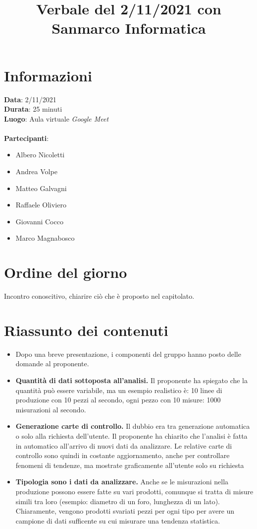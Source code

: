 \documentclass[a4paper,12pt]{article}
\author{}
\date{}
\begin{document}
\title{Verbale del 2/11/2021 con Sanmarco Informatica}
\maketitle

\section{Informazioni}
\textbf{Data}: 2/11/2021\\
\textbf{Durata}: 25 minuti\\
\textbf{Luogo}: Aula virtuale \textit{Google Meet}\\\\
\textbf{Partecipanti}:
\begin{itemize}
	\item Albero Nicoletti
	\item Andrea Volpe
	\item Matteo Galvagni
	\item Raffaele Oliviero
    \item Giovanni Cocco
    \item Marco Magnabosco
\end{itemize}

\section{Ordine del giorno}
Incontro conoscitivo, chiarire ciò che è proposto nel capitolato.

\section{Riassunto dei contenuti}

\begin{itemize}
\item Dopo una breve presentazione, i componenti del gruppo hanno posto delle domande al proponente.

\item \textbf{Quantità di dati sottoposta all'analisi.} Il proponente ha spiegato che la quantità può essere variabile, ma un esempio realistico è: 10 linee di produzione con 10 pezzi al secondo, ogni pezzo con 10 misure: 1000 misurazioni al secondo.

\item \textbf{Generazione carte di controllo.} Il dubbio era tra generazione automatica o solo alla richiesta dell'utente. Il proponente ha chiarito che l'analisi è fatta in automatico all'arrivo di nuovi dati da analizzare. Le relative carte di controllo sono quindi in costante aggiornamento, anche per controllare fenomeni di tendenze, ma mostrate graficamente all'utente solo su richiesta

\item \textbf{Tipologia sono i dati da analizzare.} Anche se le misurazioni nella produzione possono essere fatte su vari prodotti, comunque si tratta di misure simili tra loro (esempio: diametro di un foro, lunghezza di un lato). Chiaramente, vengono prodotti svariati pezzi per ogni tipo per avere un campione di dati sufficente su cui misurare una tendenza statistica.
\end{itemize}
\end{document}
